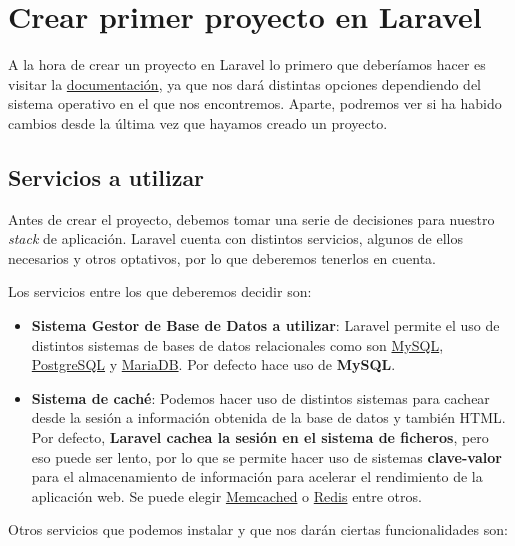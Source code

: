 \chapter{Crear primer proyecto en Laravel}

A la hora de crear un proyecto en Laravel lo primero que deberíamos hacer es visitar la \href{https://laravel.com/docs/10.x/installation}{documentación}, ya que nos dará distintas opciones dependiendo del sistema operativo en el que nos encontremos. Aparte, podremos ver si ha habido cambios desde la última vez que hayamos creado un proyecto.

\section{Servicios a utilizar}

Antes de crear el proyecto, debemos tomar una serie de decisiones para nuestro \textit{stack} de aplicación. Laravel cuenta con distintos servicios, algunos de ellos necesarios y otros optativos, por lo que deberemos tenerlos en cuenta.

Los servicios entre los que deberemos decidir son:

\begin{itemize}
    \item \textbf{Sistema Gestor de Base de Datos a utilizar}: Laravel permite el uso de distintos sistemas de bases de datos relacionales como son \href{https://dev.mysql.com/downloads/mysql/}{MySQL}, \href{https://www.postgresql.org/}{PostgreSQL} y \href{https://mariadb.org/}{MariaDB}. Por defecto hace uso de \textbf{MySQL}.
    \item \textbf{Sistema de caché}: Podemos hacer uso de distintos sistemas para cachear desde la sesión a información obtenida de la base de datos y también HTML. Por defecto, \textbf{Laravel cachea la sesión en el sistema de ficheros}, pero eso puede ser lento, por lo que se permite hacer uso de sistemas \textbf{clave-valor} para el almacenamiento de información para acelerar el rendimiento de la aplicación web. Se puede elegir \href{https://www.memcached.org/}{Memcached} o \href{https://redis.io/}{Redis} entre otros.
\end{itemize}

Otros servicios que podemos instalar y que nos darán ciertas funcionalidades son:


